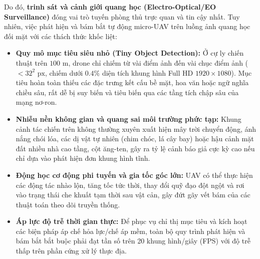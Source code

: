 \documentclass[11pt,a4paper]{article}
\begin{document}
Do đó, \textbf{trinh sát và cảnh giới quang học (Electro-Optical/EO Surveillance)} đóng vai trò tuyến phòng thủ trực quan và tin cậy nhất. Tuy nhiên, việc phát hiện và bám bắt tự động micro-UAV trên luồng ảnh quang học đối mặt với các thách thức khốc liệt:
\begin{itemize}
    \item \textbf{Quy mô mục tiêu siêu nhỏ (Tiny Object Detection):} Ở cự ly chiến thuật trên $100\text{ m}$, drone chỉ chiếm từ vài điểm ảnh đến vài chục điểm ảnh ($< 32^2\text{ px}$, chiếm dưới $0.4\%$ diện tích khung hình Full HD $1920 \times 1080$). Mục tiêu hoàn toàn thiếu các đặc trưng kết cấu bề mặt, hoa văn hoặc ngữ nghĩa chiều sâu, rất dễ bị suy biến và tiêu biến qua các tầng tích chập sâu của mạng nơ-ron.
    \item \textbf{Nhiễu nền không gian và quang sai môi trường phức tạp:} Khung cảnh tác chiến trên không thường xuyên xuất hiện mây trời chuyển động, ánh nắng chói lóa, các dị vật tự nhiên (chim chóc, lá cây bay) hoặc hậu cảnh mặt đất nhiều nhà cao tầng, cột ăng-ten, gây ra tỷ lệ cảnh báo giả cực kỳ cao nếu chỉ dựa vào phát hiện đơn khung hình tĩnh.
    \item \textbf{Động học cơ động phi tuyến và gia tốc góc lớn:} UAV có thể thực hiện các động tác nhào lộn, tăng tốc tức thời, thay đổi quỹ đạo đột ngột và rơi vào trạng thái che khuất tạm thời sau vật cản, gây đứt gãy vết bám của các thuật toán theo dõi truyền thống.
    \item \textbf{Áp lực độ trễ thời gian thực:} Để phục vụ chỉ thị mục tiêu và kích hoạt các biện pháp áp chế hỏa lực/chế áp mềm, toàn bộ quy trình phát hiện và bám bắt bắt buộc phải đạt tần số trên 20 khung hình/giây (FPS) với độ trễ thấp trên phần cứng xử lý thực địa.
\end{itemize}
\end{document}

